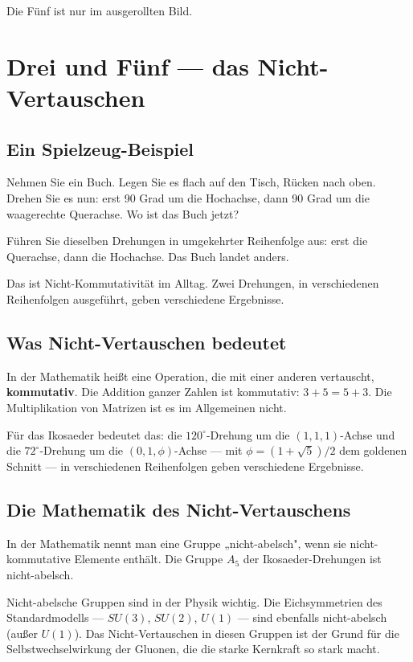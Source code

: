 \documentclass[12pt,oneside]{book}
\begin{document}
Die Fünf ist nur im ausgerollten Bild.

\chapter{Drei und Fünf — das Nicht-Vertauschen}

\section{Ein Spielzeug-Beispiel}

Nehmen Sie ein Buch. Legen Sie es flach auf den Tisch, Rücken nach oben. Drehen Sie es nun: erst 90 Grad um die Hochachse, dann 90 Grad um die waagerechte Querachse. Wo ist das Buch jetzt?

Führen Sie dieselben Drehungen in umgekehrter Reihenfolge aus: erst die Querachse, dann die Hochachse. Das Buch landet anders.

Das ist Nicht-Kommutati\-vität im Alltag. Zwei Drehungen, in verschiedenen Reihenfolgen ausgeführt, geben verschiedene Ergebnisse.

\section{Was Nicht-Vertauschen bedeutet}

In der Mathematik heißt eine Operation, die mit einer anderen vertauscht, \textbf{kommutativ}. Die Addition ganzer Zahlen ist kommutativ: $3 + 5 = 5 + 3$. Die Multiplikation von Matrizen ist es im Allgemeinen nicht.

Für das Ikosaeder bedeutet das: die $120^\circ$-Drehung um die $(1, 1, 1)$-Achse und die $72^\circ$-Drehung um die $(0, 1, \phi)$-Achse — mit $\phi = (1 + \sqrt{5})/2$ dem goldenen Schnitt — in verschiedenen Reihenfolgen geben verschiedene Ergebnisse.

\section{Die Mathematik des Nicht-Vertauschens}

In der Mathematik nennt man eine Gruppe „nicht-abelsch", wenn sie nicht-kommutative Elemente enthält. Die Gruppe $A_5$ der Ikosaeder-Drehungen ist nicht-abelsch.

Nicht-abelsche Gruppen sind in der Physik wichtig. Die Eichsymmetrien des Standardmodells — $SU(3)$, $SU(2)$, $U(1)$ — sind ebenfalls nicht-abelsch (außer $U(1)$). Das Nicht-Vertauschen in diesen Gruppen ist der Grund für die Selbstwechselwirkung der Gluonen, die die starke Kernkraft so stark macht.
\end{document}
